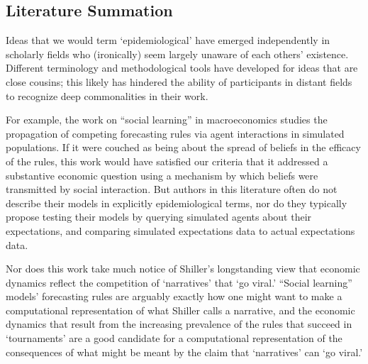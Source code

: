 

\hypertarget{subsec:literature}{}

\subsection{Literature Summation}\label{subsec:literature}


Ideas that we would term `epidemiological' have emerged independently in scholarly fields who (ironically) seem largely unaware of each others' existence.  Different terminology and methodological tools have developed for ideas that are close cousins; this likely has hindered the ability of participants in distant fields to recognize deep commonalities in their work.

For example, the work on ``social learning'' in macroeconomics studies the propagation of competing forecasting rules via agent interactions in simulated populations.  If it were couched as being about the spread of beliefs in the efficacy of the rules, this work would have satisfied our criteria that it addressed a substantive economic question using a mechanism by which beliefs were transmitted by social interaction.  But authors in this literature often do not describe their models in explicitly epidemiological terms, nor do they typically propose testing their models by querying simulated agents about their expectations, and comparing simulated expectations data to actual expectations data.

Nor does this work take much notice of Shiller's longstanding view that economic dynamics reflect the competition of `narratives' that `go viral.'  ``Social learning'' models'  forecasting rules are arguably exactly how one might want to make a computational representation of what Shiller calls a narrative, and the economic dynamics that result from the increasing prevalence of the rules that succeed in `tournaments' are a good candidate for a computational representation of the consequences of what might be meant by the claim that `narratives' can `go viral.'

